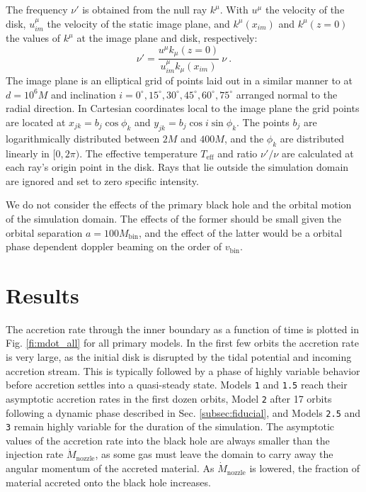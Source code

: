 \documentclass{emulateapj}
\newcommand{\model}[1]{{Model \texttt{#1}}}
\begin{document}
The frequency $\nu'$ is obtained from the null ray $k^\mu$.  With $u^\mu$ the velocity of the disk, $u_{im}^\mu$ the velocity of the static image plane, and $k^\mu(x_{im})$ and $k^\mu(z=0)$ the values of $k^\mu$ at the image plane and disk, respectively:
\begin{equation}
	\nu' = \frac{u^\mu k_\mu(z=0)}{u^\mu_{im} k_\mu(x_{im})} \ \nu \ .
\end{equation}
The image plane is an elliptical grid of points laid out in a similar manner to \cite{Kulkarni11} at $d=10^6M$ and inclination $i = 0^\circ, 15^\circ, 30^\circ, 45^\circ, 60^\circ, 75^\circ$ arranged normal to the radial direction.  In Cartesian coordinates local to the image plane the grid points are located at $x_{jk} = b_j \cos \phi_k$ and $y_{jk} = b_j \cos i \sin \phi_k$.  The points $b_j$ are logarithmically distributed between $2M$ and $400M$, and the  $\phi_k$ are distributed linearly in $[0, 2\pi)$. The effective temperature $T_\text{eff}$ and ratio $\nu' / \nu$ are calculated at each ray's origin point in the disk.  Rays that lie outside the simulation domain are ignored and set to zero specific intensity.

We do not consider the effects of the primary black hole and the orbital motion of the simulation domain.  The effects of the former should be small given the orbital separation $a = 100M_\text{bin}$, and the effect of the latter would be a orbital phase dependent doppler beaming on the order of $v_\text{bin}$.



\section{Results}
\label{sec:results}

The accretion rate through the inner boundary as a function of time is plotted in Fig. \ref{fi:mdot_all} for all primary models.  In the first few orbits the accretion rate is very large, as the initial disk is disrupted by the tidal potential and incoming accretion stream.  This is typically followed by a phase of highly variable behavior before accretion settles into a quasi-steady state.  Models \texttt{1} and \texttt{1.5} reach their asymptotic accretion rates in the first dozen orbits, \model{2} after 17 orbits following a dynamic phase described in Sec. \ref{subsec:fiducial}, and Models \texttt{2.5} and \texttt{3} remain highly variable for the duration of the simulation.  The asymptotic values of the accretion rate into the black hole are always smaller than the injection rate $\dot{M}_\text{nozzle}$, as some gas must leave the domain to carry away the angular momentum of the accreted material.  As $\dot{M}_\text{nozzle}$ is lowered, the fraction of material accreted onto the black hole increases.
\end{document}
